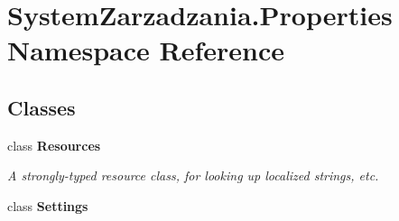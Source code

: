 \hypertarget{namespace_system_zarzadzania_1_1_properties}{}\section{System\+Zarzadzania.\+Properties Namespace Reference}
\label{namespace_system_zarzadzania_1_1_properties}
\subsection*{Classes}
\begin{DoxyCompactItemize}
\item 
class {\bfseries Resources}
\begin{DoxyCompactList}\small\item\em A strongly-\/typed resource class, for looking up localized strings, etc. \end{DoxyCompactList}\item 
class {\bfseries Settings}
\end{DoxyCompactItemize}
